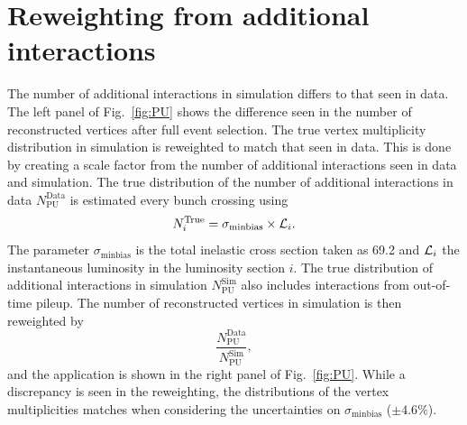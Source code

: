 \section{Reweighting from additional interactions} %
\label{sub:reweighting_from_additional_interactions}

The number of additional interactions in simulation differs to that seen in data.
The left panel of Fig.~\ref{fig:PU} shows the difference seen in the number of reconstructed vertices after full event selection.
The true vertex multiplicity distribution in simulation is reweighted to match that seen in data.
This is done by creating a scale factor from the number of additional interactions seen in data and simulation.
The true distribution of the number of additional interactions in data $N_{\mathrm{PU}}^{\mathrm{Data}}$ is estimated every bunch crossing using
\begin{equation*}
	N_{i}^{\mathrm{True}} = \sigma_{\mathrm{minbias}} \times \mathcal{L}_{i}.
\end{equation*}
The parameter $\sigma_{\mathrm{minbias}}$ is the total inelastic cross section taken as 69.2\mb{} and $\mathcal{L}_{i}$ the instantaneous luminosity in the luminosity section $i$.
The true distribution of additional interactions in simulation $N_{\mathrm{PU}}^{\mathrm{Sim}}$ also includes interactions from out-of-time pileup.
The number of reconstructed vertices in simulation is then reweighted by 
\begin{equation}
	\frac{N_{\mathrm{PU}}^{\mathrm{Data}}}{N_{\mathrm{PU}}^{\mathrm{Sim}}},
\end{equation}
and the application is shown in the right panel of Fig.~\ref{fig:PU}.
While a discrepancy is seen in the reweighting, the distributions of the vertex multiplicities matches when considering the uncertainties on $\sigma_{\mathrm{minbias}}$ ($\pm4.6\%$).

